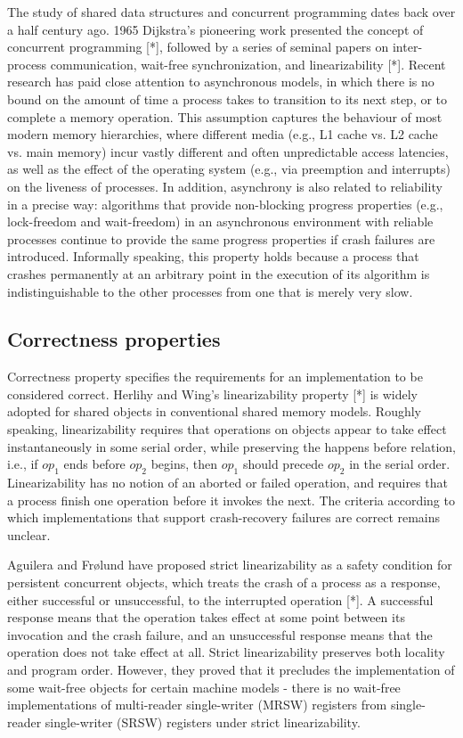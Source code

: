 \documentclass{article}
\begin{document}
The study of shared data structures and concurrent programming dates back over a half century ago. 1965 Dijkstra's pioneering work presented the concept of concurrent programming [*], followed by a series of seminal papers on inter-process communication, wait-free synchronization, and linearizability [*].
Recent research has paid close attention to asynchronous models, in which there is no bound on the amount of time a process takes to transition to its next step, or to complete a memory operation. This assumption captures the behaviour of most modern memory hierarchies, where different media (e.g., L1 cache vs. L2 cache vs. main memory) incur vastly different and often unpredictable access latencies, as well as the effect of the operating system (e.g., via preemption and interrupts) on the liveness of processes. In addition, asynchrony is also related to reliability in a precise way: algorithms that provide non-blocking progress properties (e.g., lock-freedom and wait-freedom) in an asynchronous environment with reliable processes continue to provide the same progress properties if crash failures are introduced. Informally speaking, this property holds because a process that crashes permanently at an arbitrary point in the execution of its algorithm is indistinguishable to the other processes from one that is merely very slow.

\subsection{Correctness properties}
Correctness property specifies the requirements for an implementation to be considered correct. Herlihy and Wing’s linearizability property [*] is widely adopted for shared objects in conventional shared memory models.  Roughly speaking, linearizability requires that operations on objects appear to take effect instantaneously in some serial order, while preserving the happens before relation, i.e., if $op_1$ ends before $op_2$ begins, then $op_1$ should precede $op_2$ in the serial order. Linearizability has no notion of an aborted or failed operation, and requires that a process finish one operation before it invokes the next. The criteria according to which implementations that support crash-recovery failures are correct remains unclear.

Aguilera and Frølund have proposed strict linearizability as a safety condition for persistent concurrent objects, which treats the crash of a process as a response, either successful or unsuccessful, to the interrupted operation [*]. A successful response means that the operation takes effect at some point between its invocation and the crash failure, and an unsuccessful response means that the operation does not take effect at all. Strict linearizability preserves both locality and program order. However, they proved that it precludes the implementation of some wait-free objects for certain machine models - there is no wait-free implementations of multi-reader single-writer (MRSW) registers from single-reader single-writer (SRSW) registers under strict linearizability.
\end{document}
